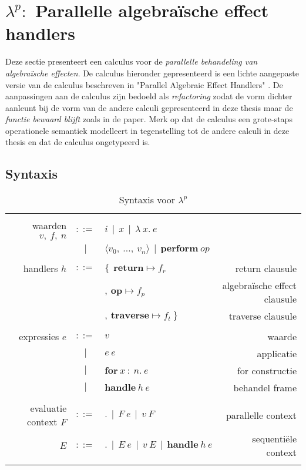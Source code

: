 \section{\texorpdfstring{$\lambda^{p}:$}{} Parallelle algebraïsche effect handlers} \label{hoofdstuk:startpuntParallel}
Deze sectie presenteert een calculus voor de \emph{parallelle behandeling van algebraïsche effecten}. De calculus hieronder gepresenteerd is een lichte aangepaste versie van de calculus beschreven in "Parallel Algebraic Effect Handlers" \cite{Xie2021}. De aanpassingen aan de calculus zijn bedoeld als \emph{refactoring} zodat de vorm dichter aanleunt bij de vorm van de andere calculi gepresenteerd in deze thesis maar de \emph{functie bewaard blijft} zoals in de paper. Merk op dat de calculus een grote-staps operationele semantiek modelleert in tegenstelling tot de andere calculi in deze thesis en dat de calculus ongetypeerd is.

\subsection{Syntaxis}
\begin{table}
    \centering
    \begin{tabular}{|r c l r|}
    \hline
         & & & \\ 
         waarden $v,\:f,\:n$ & $::=$ & $i \: \: | \: \: x \: \: | \: \: \lambda \:x.\:e \: \:$ & \\
         & $|$ & $\langle v_{0},\: ... , \: v_{n} \rangle \: \: | \: \: \textbf{perform}\:op$ & \\
         & & & \\
         handlers $h$ & $::=$ & $\{ \: \: \textbf{return} \mapsto f_{r}$ & return clausule\\
         & & $, \: \textbf{op} \mapsto f_{p}$ & algebraïsche effect  clausule \\
         & & $, \: \textbf{traverse} \mapsto f_{t} \: \} $ & traverse clausule \\
         & & & \\
         expressies $e$ & $::=$ & $v$ & waarde \\
          & $|$ & $e\:e$ & applicatie \\
          & $|$ & $\textbf{for}\:x\::\:n.\:e$ & for constructie \\
          & $|$ & $\textbf{handle}\:h\:e$ & behandel frame \\
         & & & \\
         evaluatie context $F$ & $::=$ & $. \: \: | \: \: F \: e \: \: | \: \: v\:F$ & parallelle context \\
         $E$ & $::=$ & $. \: \: | \:\: E\:e \: \: | \: \: v\:E \:\: | \:\: \textbf{handle}\:h\:e$ & sequentiële context\\
         & & & \\
    \hline
    \end{tabular}
    \caption{Syntaxis voor $\lambda^{p}$}
    \label{fig:syntaxisPar}
\end{table}

